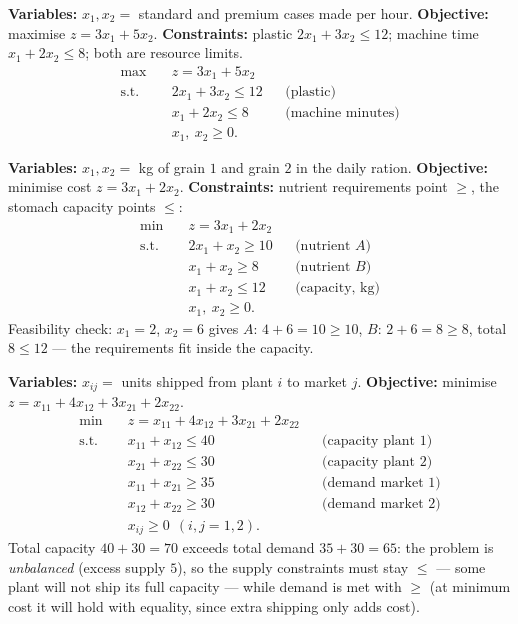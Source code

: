 \begin{solutions}
  \item \textbf{Variables:} $x_1,x_2=$ standard and premium cases made
        per hour. \textbf{Objective:} maximise $z=3x_1+5x_2$.
        \textbf{Constraints:} plastic $2x_1+3x_2\le 12$; machine time
        $x_1+2x_2\le 8$; both are resource limits.
        \[
          \begin{aligned}
            \max\quad & z=3x_1+5x_2\\
            \text{s.t.}\quad & 2x_1+3x_2\le 12 &&\text{(plastic)}\\
            & x_1+2x_2\le 8 &&\text{(machine minutes)}\\
            & x_1,\ x_2\ge 0 .
          \end{aligned}
        \]

  \item \textbf{Variables:} $x_1,x_2=$ kg of grain $1$ and grain $2$ in
        the daily ration. \textbf{Objective:} minimise cost
        $z=3x_1+2x_2$. \textbf{Constraints:} nutrient requirements point
        $\ge$, the stomach capacity points $\le$:
        \[
          \begin{aligned}
            \min\quad & z=3x_1+2x_2\\
            \text{s.t.}\quad & 2x_1+x_2\ge 10 &&\text{(nutrient } A)\\
            & x_1+x_2\ge 8 &&\text{(nutrient } B)\\
            & x_1+x_2\le 12 &&\text{(capacity, kg)}\\
            & x_1,\ x_2\ge 0 .
          \end{aligned}
        \]
        Feasibility check: $x_1=2$, $x_2=6$ gives $A$: $4+6=10\ge 10$,
        $B$: $2+6=8\ge 8$, total $8\le 12$ — the requirements fit inside
        the capacity.

  \item \textbf{Variables:} $x_{ij}=$ units shipped from plant $i$ to
        market $j$. \textbf{Objective:} minimise
        $z=x_{11}+4x_{12}+3x_{21}+2x_{22}$.
        \[
          \begin{aligned}
            \min\quad & z=x_{11}+4x_{12}+3x_{21}+2x_{22}\\
            \text{s.t.}\quad & x_{11}+x_{12}\le 40 &&\text{(capacity plant 1)}\\
            & x_{21}+x_{22}\le 30 &&\text{(capacity plant 2)}\\
            & x_{11}+x_{21}\ge 35 &&\text{(demand market 1)}\\
            & x_{12}+x_{22}\ge 30 &&\text{(demand market 2)}\\
            & x_{ij}\ge 0\ \ (i,j=1,2) .
          \end{aligned}
        \]
        Total capacity $40+30=70$ exceeds total demand $35+30=65$: the
        problem is \emph{unbalanced} (excess supply $5$), so the supply
        constraints must stay $\le$ — some plant will not ship its full
        capacity — while demand is met with $\ge$ (at minimum cost it
        will hold with equality, since extra shipping only adds cost).


\end{solutions}
